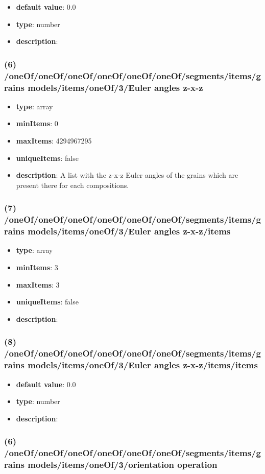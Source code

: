 \begin{itemize}[leftmargin=9em]\item {\bf default value}: 0.0
\item {\bf type}: number
\item {\bf description}: 
\end{itemize}\subsubsection{(6) /oneOf/oneOf/oneOf/oneOf/oneOf/oneOf/segments/items/grains models/items/oneOf/3/Euler angles z-x-z}
\begin{itemize}[leftmargin=6em]\item {\bf type}: array
\item {\bf minItems}: 0
\item {\bf maxItems}: 4294967295
\item {\bf uniqueItems}: false
\item {\bf description}: A list with the z-x-z Euler angles of the grains which are present there for each compositions.
\end{itemize}\subsubsection{(7) /oneOf/oneOf/oneOf/oneOf/oneOf/oneOf/segments/items/grains models/items/oneOf/3/Euler angles z-x-z/items}
\begin{itemize}[leftmargin=7em]\item {\bf type}: array
\item {\bf minItems}: 3
\item {\bf maxItems}: 3
\item {\bf uniqueItems}: false
\item {\bf description}: 
\end{itemize}\subsubsection{(8) /oneOf/oneOf/oneOf/oneOf/oneOf/oneOf/segments/items/grains models/items/oneOf/3/Euler angles z-x-z/items/items}
\begin{itemize}[leftmargin=8em]\item {\bf default value}: 0.0
\item {\bf type}: number
\item {\bf description}: 
\end{itemize}\subsubsection{(6) /oneOf/oneOf/oneOf/oneOf/oneOf/oneOf/segments/items/grains models/items/oneOf/3/orientation operation}
